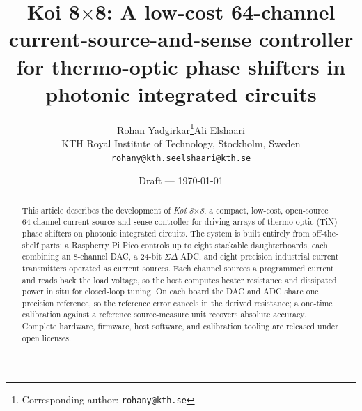\documentclass[11pt]{article}
\title{\textbf{Koi 8$\times$8: A low-cost 64-channel current-source-and-sense controller for thermo-optic phase shifters in photonic integrated circuits}}
\author{%
  Rohan Yadgirkar\thanks{Corresponding author: \texttt{rohany@kth.se}}\quad Ali Elshaari\\[4pt]
  \normalsize KTH Royal Institute of Technology, Stockholm, Sweden\\[2pt]
  \small\texttt{rohany@kth.se}\quad\texttt{elshaari@kth.se}%
}
\date{Draft --- \today}
\begin{document}
\maketitle

\begin{abstract}
This article describes the development of \emph{Koi 8$\times$8}, a compact,
low-cost, open-source 64-channel current-source-and-sense controller for
driving arrays of thermo-optic (TiN) phase shifters on photonic integrated
circuits. The system is built entirely from off-the-shelf parts: a Raspberry
Pi Pico controls up to eight stackable daughterboards, each combining an
8-channel DAC, a 24-bit $\Sigma\Delta$ ADC, and eight precision industrial
current transmitters operated as current sources. Each channel sources a
programmed current and reads back the load voltage, so the host computes
heater resistance and dissipated power in situ for closed-loop tuning. On
each board the DAC and ADC share one precision reference, so the reference
error cancels in the derived resistance; a one-time calibration against a
reference source-measure unit recovers absolute accuracy. Complete hardware,
firmware, host software, and calibration tooling are released under open
licenses.
\end{abstract}

\end{document}
